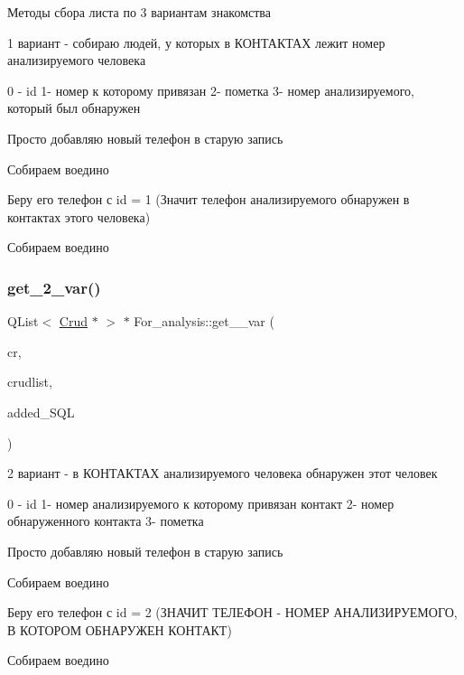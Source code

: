 Методы сбора листа по 3 вариантам знакомства 

1 вариант -\/ собираю людей, у которых в КОНТАКТАХ лежит номер анализируемого человека

0 -\/ id 1-\/ номер к которому привязан 2-\/ пометка 3-\/ номер анализируемого, который был обнаружен

Просто добавляю новый телефон в старую запись

Собираем воедино

Беру его телефон с id = 1 (Значит телефон анализируемого обнаружен в контактах этого человека)

Собираем воедино \mbox{\label{class_for__analysis_a43408fde4bae007cd9cb223518a3f2f1}} 
\subsubsection{\texorpdfstring{get\_2\_var()}{get\_2\_var()}}
{\footnotesize\ttfamily Q\+List$<$ \mbox{\hyperlink{class_crud}{Crud}} $\ast$ $>$ $\ast$ For\+\_\+analysis\+::get\+\_\+\_\+var (\begin{DoxyParamCaption}\item[{\mbox{\hyperlink{class_crud}{Crud}} $\ast$}]{cr,  }\item[{Q\+List$<$ \mbox{\hyperlink{class_crud}{Crud}} $\ast$ $>$ $\ast$}]{crudlist,  }\item[{Q\+String}]{added\+\_\+\+S\+QL }\end{DoxyParamCaption})}

2 вариант -\/ в КОНТАКТАХ анализируемого человека обнаружен этот человек

0 -\/ id 1-\/ номер анализируемого к которому привязан контакт 2-\/ номер обнаруженного контакта 3-\/ пометка

Просто добавляю новый телефон в старую запись

Собираем воедино

Беру его телефон с id = 2 (ЗНАЧИТ ТЕЛЕФОН -\/ НОМЕР АНАЛИЗИРУЕМОГО, В КОТОРОМ ОБНАРУЖЕН КОНТАКТ)

Собираем воедино \mbox{\label{class_for__analysis_acf3fa003dff0a49b33fcd628b5fc0e98}} 
